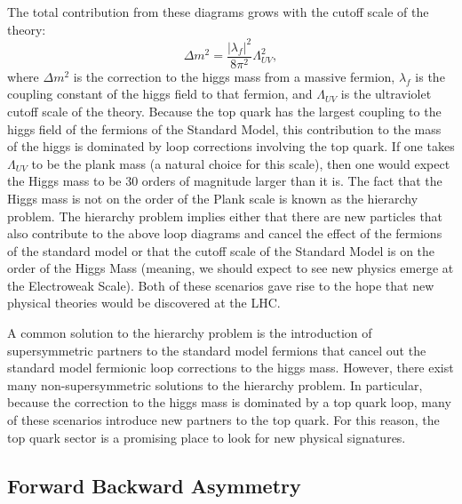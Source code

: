 The total contribution from these diagrams grows with the cutoff scale of the theory:
\begin{equation}
  \Delta m^{2} = \frac{|\lambda_f|^2}{8\pi^2}\Lambda_{UV}^2 ,
\end{equation}
where $\Delta m^{2}$ is the correction to the higgs mass from a massive fermion, $\lambda_f$ is the coupling constant of the higgs field to that fermion,
and $\Lambda_{UV}$ is the ultraviolet cutoff scale of the theory.
Because the top quark has the largest coupling to the higgs field of the fermions of the Standard Model,
this contribution to the mass of the higgs is dominated by loop corrections involving the top quark.
If one takes $\Lambda_{UV}$ to be the plank mass (a natural choice for this scale),
then one would expect the Higgs mass to be 30 orders of magnitude larger than it is.
The fact that the Higgs mass is not on the order of the Plank scale is known as the hierarchy problem.
The hierarchy problem implies either that there are new particles that also contribute to the above loop diagrams
and cancel the effect of the fermions of the standard model
or that the cutoff scale of the Standard Model is on the order of the Higgs Mass (meaning, we should expect to see new physics emerge at the Electroweak Scale).
Both of these scenarios gave rise to the hope that new physical theories would be discovered at the LHC.

A common solution to the hierarchy problem is the introduction of supersymmetric partners to the standard model fermions
that cancel out the standard model fermionic loop corrections to the higgs mass.
However, there exist many non-supersymmetric solutions to the hierarchy problem.
In particular, because the correction to the higgs mass is dominated by a top quark loop, many of these scenarios introduce new partners to the top quark.
For this reason, the top quark sector is a promising place to look for new physical signatures.


\subsection{Forward Backward Asymmetry}

